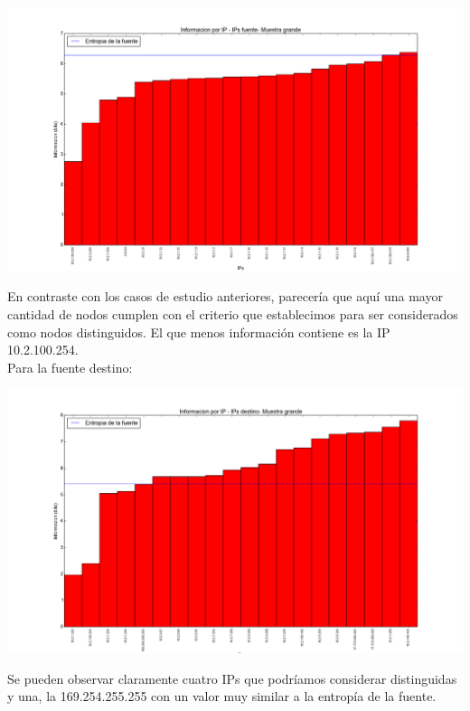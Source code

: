 \begin{center}
\includegraphics[scale=0.5,clip=true,trim=100 0 0 0]{graphics/facultad_grande_src.png}
\end{center}

\indent En contraste con los casos de estudio anteriores, parecería que aquí una mayor cantidad de nodos cumplen con el criterio que establecimos para ser considerados como nodos distinguidos. El que menos información contiene es la IP 10.2.100.254.\\

\indent Para la fuente destino:\\
\begin{center}
\includegraphics[scale=0.5,clip=true,trim=100 0 0 0]{graphics/facultad_grande_dst.png}
\end{center}
\indent Se pueden observar claramente cuatro IPs que podríamos considerar distinguidas y una, la 169.254.255.255 con un valor muy similar a la entropía de la fuente.\\

